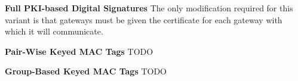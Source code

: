 \noindent
\textbf{Full PKI-based Digital Signatures}
The only modification required for this variant is that gateways must be given the certificate for each gateway with which it will communicate.

\noindent
\textbf{Pair-Wise Keyed MAC Tags}
TODO

\noindent
\textbf{Group-Based Keyed MAC Tags}
TODO

    






